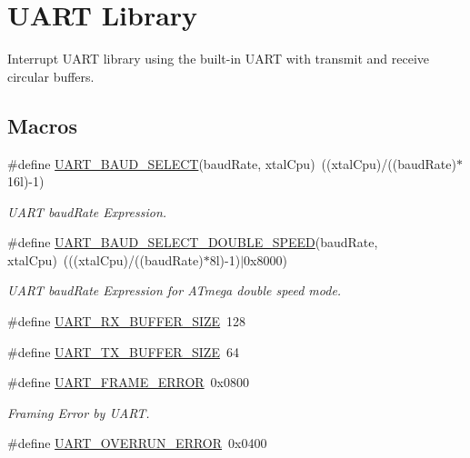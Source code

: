 \hypertarget{group__pfleury__uart}{\section{U\-A\-R\-T Library}
\label{group__pfleury__uart}
}


Interrupt U\-A\-R\-T library using the built-\/in U\-A\-R\-T with transmit and receive circular buffers.  


\subsection*{Macros}
\begin{DoxyCompactItemize}
\item 
\#define \hyperlink{group__pfleury__uart_ga367ff7b5de225ed936a63239ad4adb0b}{U\-A\-R\-T\-\_\-\-B\-A\-U\-D\-\_\-\-S\-E\-L\-E\-C\-T}(baud\-Rate, xtal\-Cpu)~((xtal\-Cpu)/((baud\-Rate)$\ast$16l)-\/1)
\begin{DoxyCompactList}\small\item\em U\-A\-R\-T baud\-Rate Expression. \end{DoxyCompactList}\item 
\#define \hyperlink{group__pfleury__uart_ga1a02d45130520cb651ab313e69039382}{U\-A\-R\-T\-\_\-\-B\-A\-U\-D\-\_\-\-S\-E\-L\-E\-C\-T\-\_\-\-D\-O\-U\-B\-L\-E\-\_\-\-S\-P\-E\-E\-D}(baud\-Rate, xtal\-Cpu)~(((xtal\-Cpu)/((baud\-Rate)$\ast$8l)-\/1)$|$0x8000)
\begin{DoxyCompactList}\small\item\em U\-A\-R\-T baud\-Rate Expression for A\-Tmega double speed mode. \end{DoxyCompactList}\item 
\#define \hyperlink{group__pfleury__uart_ga5bdd6772c246436bb14377095de79b31}{U\-A\-R\-T\-\_\-\-R\-X\-\_\-\-B\-U\-F\-F\-E\-R\-\_\-\-S\-I\-Z\-E}~128
\item 
\#define \hyperlink{group__pfleury__uart_ga05f5d709605c6317c97e4974bec3402a}{U\-A\-R\-T\-\_\-\-T\-X\-\_\-\-B\-U\-F\-F\-E\-R\-\_\-\-S\-I\-Z\-E}~64
\item 
\hypertarget{group__pfleury__uart_gabcdb1041d763560cd8f8e722370dfd37}{\#define \hyperlink{group__pfleury__uart_gabcdb1041d763560cd8f8e722370dfd37}{U\-A\-R\-T\-\_\-\-F\-R\-A\-M\-E\-\_\-\-E\-R\-R\-O\-R}~0x0800}\label{group__pfleury__uart_gabcdb1041d763560cd8f8e722370dfd37}

\begin{DoxyCompactList}\small\item\em Framing Error by U\-A\-R\-T. \end{DoxyCompactList}\item 
\hypertarget{group__pfleury__uart_ga3183177e3613d8785d8cc8516931beb6}{\#define \hyperlink{group__pfleury__uart_ga3183177e3613d8785d8cc8516931beb6}{U\-A\-R\-T\-\_\-\-O\-V\-E\-R\-R\-U\-N\-\_\-\-E\-R\-R\-O\-R}~0x0400}\label{group__pfleury__uart_ga3183177e3613d8785d8cc8516931beb6}


\end{DoxyCompactItemize}
